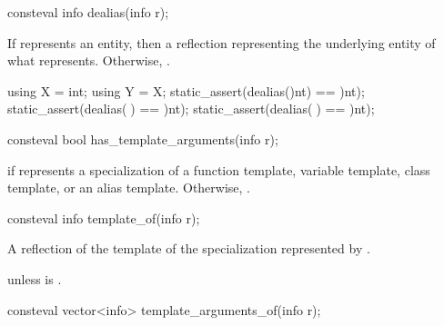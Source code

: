 %
\begin{itemdecl}
consteval info dealias(info r);
\end{itemdecl}

\begin{itemdescr}
\pnum
\returns
If  represents an entity, then
a reflection representing the underlying entity of what  represents.
Otherwise, .

\pnum
\begin{example}
\begin{codeblock}
using X = int;
using Y = X;
static_assert(dealias(^^int) == ^^int);
static_assert(dealias(^^X) == ^^int);
static_assert(dealias(^^Y) == ^^int);
\end{codeblock}
\end{example}
\end{itemdescr}

%
\begin{itemdecl}
consteval bool has_template_arguments(info r);
\end{itemdecl}

\begin{itemdescr}
\pnum
\returns
{} if  represents a specialization of a
function template,
variable template,
class template, or
an alias template.
Otherwise, .
\end{itemdescr}

%
\begin{itemdecl}
consteval info template_of(info r);
\end{itemdecl}

\begin{itemdescr}
\pnum
\returns
A reflection of the template of the specialization represented by .

\pnum
\throws
{} unless
 is .
\end{itemdescr}

%
\begin{itemdecl}
consteval vector<info> template_arguments_of(info r);
\end{itemdecl}

